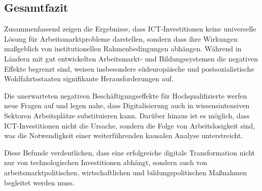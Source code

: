 \subsection{Gesamtfazit}

Zusammenfassend zeigen die Ergebnisse, dass \ac{ICT}-Investitionen keine universelle 
Lösung für Arbeitsmarktprobleme darstellen, sondern dass ihre Wirkungen maßgeblich von 
institutionellen Rahmenbedingungen abhängen. Während in Ländern mit gut entwickelten 
Arbeitsmarkt- und Bildungssystemen die negativen Effekte begrenzt sind, weisen insbesondere 
südeuropäische und postsozialistische Wohlfahrtsstaaten signifikante Herausforderungen auf.

Die unerwarteten negativen Beschäftigungseffekte für Hochqualifizierte werfen neue Fragen 
auf und legen nahe, dass Digitalisierung auch in wissensintensiven Sektoren Arbeitsplätze 
substituieren kann. Darüber hinaus ist es möglich, dass ICT-Investitionen nicht die Ursache, 
sondern die Folge von Arbeitslosigkeit sind, was die Notwendigkeit einer weiterführenden 
kausalen Analyse unterstreicht.

Diese Befunde verdeutlichen, dass eine erfolgreiche digitale Transformation nicht nur von 
technologischen Investitionen abhängt, sondern auch von arbeitsmarktpolitischen, 
wirtschaftlichen und bildungspolitischen Maßnahmen begleitet werden muss.
